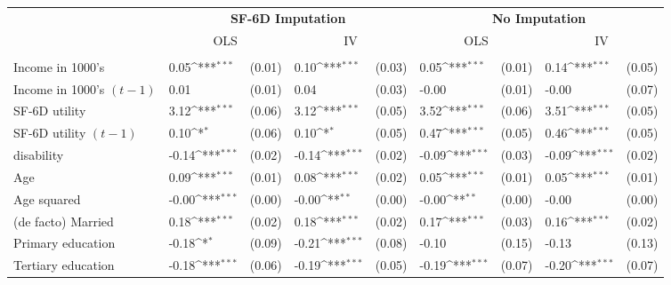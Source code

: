 {
\def\sym#1{\ifmmode^{#1}\else\(^{#1}\)\fi}
\begin{tabular}{l*{4}{lc}}
\hline\hline
                    &\multicolumn{4}{c}{\textbf{SF-6D Imputation}}                        &\multicolumn{4}{c}{\textbf{No Imputation}}                           \\\cmidrule(lr){2-5}\cmidrule(lr){6-9}
                    &\multicolumn{2}{c}{OLS}           &\multicolumn{2}{c}{IV}            &\multicolumn{2}{c}{OLS}           &\multicolumn{2}{c}{IV}            \\
\hline
\\ Income in 1000's &        0.05\sym{***}&      (0.01)&        0.10\sym{***}&      (0.03)&        0.05\sym{***}&      (0.01)&        0.14\sym{***}&      (0.05)\\
Income in 1000's $(t-1)$&        0.01         &      (0.01)&        0.04         &      (0.03)&       -0.00         &      (0.01)&       -0.00         &      (0.07)\\
SF-6D utility       &        3.12\sym{***}&      (0.06)&        3.12\sym{***}&      (0.05)&        3.52\sym{***}&      (0.06)&        3.51\sym{***}&      (0.05)\\
SF-6D utility $(t-1)$&        0.10\sym{*}  &      (0.06)&        0.10\sym{*}  &      (0.05)&        0.47\sym{***}&      (0.05)&        0.46\sym{***}&      (0.05)\\
disability          &       -0.14\sym{***}&      (0.02)&       -0.14\sym{***}&      (0.02)&       -0.09\sym{***}&      (0.03)&       -0.09\sym{***}&      (0.02)\\
Age                 &        0.09\sym{***}&      (0.01)&        0.08\sym{***}&      (0.02)&        0.05\sym{***}&      (0.01)&        0.05\sym{***}&      (0.01)\\
Age squared         &       -0.00\sym{***}&      (0.00)&       -0.00\sym{**} &      (0.00)&       -0.00\sym{**} &      (0.00)&       -0.00         &      (0.00)\\
(de facto) Married  &        0.18\sym{***}&      (0.02)&        0.18\sym{***}&      (0.02)&        0.17\sym{***}&      (0.03)&        0.16\sym{***}&      (0.02)\\
Primary education   &       -0.18\sym{*}  &      (0.09)&       -0.21\sym{***}&      (0.08)&       -0.10         &      (0.15)&       -0.13         &      (0.13)\\
Tertiary education  &       -0.18\sym{***}&      (0.06)&       -0.19\sym{***}&      (0.05)&       -0.19\sym{***}&      (0.07)&       -0.20\sym{***}&      (0.07)\\

\end{tabular}}
